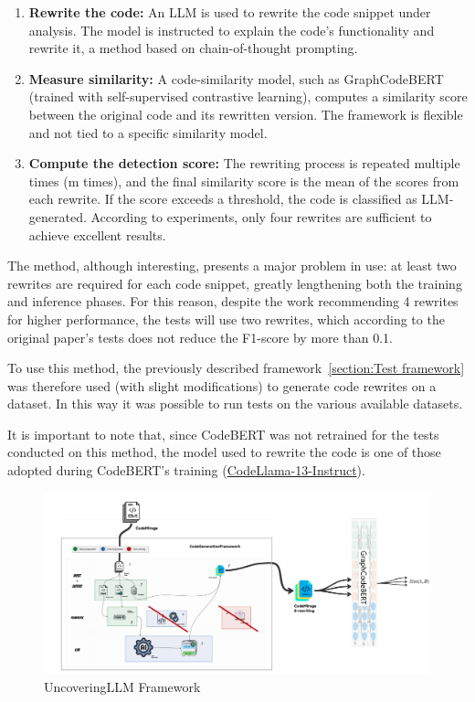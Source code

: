 \begin{enumerate}
\item \textbf{Rewrite the code:} An LLM is used to rewrite the code snippet under analysis. 
The model is instructed to explain the code’s functionality and rewrite it, a 
method based on chain-of-thought prompting.

\item \textbf{Measure similarity:} A code-similarity model, such as 
GraphCodeBERT\cite{guo2020graphcodebert} 
(trained with self-supervised contrastive learning), computes a similarity 
score between the original code and its rewritten version. The framework is 
flexible and not tied to a specific similarity model.

\item \textbf{Compute the detection score:} The rewriting process is repeated multiple times 
(m times), and the final similarity score is the mean of the scores from each 
rewrite. If the score exceeds a threshold, the code is classified as LLM-generated. 
According to experiments, only four rewrites are sufficient to achieve excellent results.
\end{enumerate}

The method, although interesting, presents a major problem in use: 
at least two rewrites are required for each code snippet, greatly 
lengthening both the training and inference phases. For this reason, 
despite the work recommending 4 rewrites for higher performance, the tests 
will use two rewrites, which according to the original paper’s tests does not 
reduce the F1-score by more than 0.1.

To use this method, the previously described framework~\ref{section:Test framework} 
was therefore used (with slight modifications) to generate code rewrites on a 
dataset. In this way it was possible to run tests on the various available datasets.

It is important to note that, since CodeBERT was not retrained for the tests 
conducted on this method, the model used to rewrite the code is one of those 
adopted during CodeBERT’s training 
(\href{https://huggingface.co/codellama/CodeLlama-13b-Instruct-hf}{CodeLlama-13-Instruct}\cite{roziere2023code}).

\begin{figure}[H]
    \centering
    \includegraphics[width=1\textwidth]{img/UncoveringLLM/framework.jpg}
    \caption{UncoveringLLM Framework}
    \label{fig:UncoveringLLM Framework}
\end{figure}



